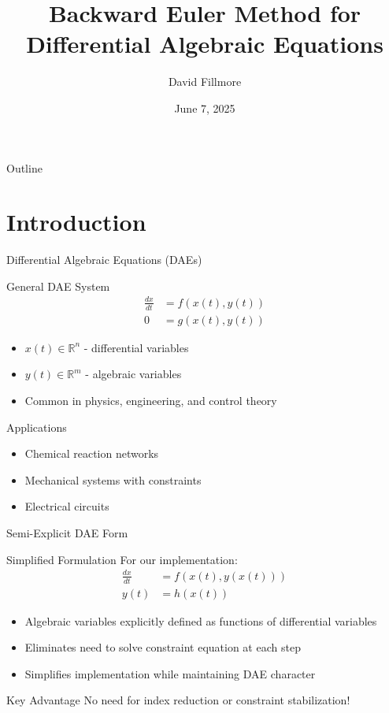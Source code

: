 \documentclass[10pt]{beamer}
\title{Backward Euler Method for Differential Algebraic Equations}
\author{David Fillmore}
\date{June 7, 2025}
\institute{Physics Simulation Project}
\newcommand{\R}{\mathbb{R}}
\begin{document}
\frame{\titlepage}

\begin{frame}{Outline}
\tableofcontents
\end{frame}

\section{Introduction}

\begin{frame}{Differential Algebraic Equations (DAEs)}
\begin{block}{General DAE System}
\begin{align}
\frac{dx}{dt} &= f(x(t), y(t)) \tag{ODE part}\\
0 &= g(x(t), y(t)) \tag{Algebraic constraint}
\end{align}
\end{block}

\begin{itemize}
\item $x(t) \in \R^n$ - differential variables
\item $y(t) \in \R^m$ - algebraic variables
\item Common in physics, engineering, and control theory
\end{itemize}

\begin{exampleblock}{Applications}
\begin{itemize}
\item Chemical reaction networks
\item Mechanical systems with constraints
\item Electrical circuits
\end{itemize}
\end{exampleblock}
\end{frame}

\begin{frame}{Semi-Explicit DAE Form}
\begin{block}{Simplified Formulation}
For our implementation:
\begin{align}
\frac{dx}{dt} &= f(x(t), y(x(t))) \\
y(t) &= h(x(t))
\end{align}
\end{block}

\begin{itemize}
\item Algebraic variables explicitly defined as functions of differential variables
\item Eliminates need to solve constraint equation at each step
\item Simplifies implementation while maintaining DAE character
\end{itemize}

\pause
\begin{alertblock}{Key Advantage}
No need for index reduction or constraint stabilization!
\end{alertblock}
\end{frame}
\end{document}
